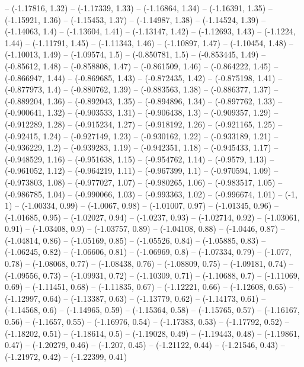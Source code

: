 -- (-1.17816, 1.32)
-- (-1.17339, 1.33)
-- (-1.16864, 1.34)
-- (-1.16391, 1.35)
-- (-1.15921, 1.36)
-- (-1.15453, 1.37)
-- (-1.14987, 1.38)
-- (-1.14524, 1.39)
-- (-1.14063, 1.4)
-- (-1.13604, 1.41)
-- (-1.13147, 1.42)
-- (-1.12693, 1.43)
-- (-1.1224, 1.44)
-- (-1.11791, 1.45)
-- (-1.11343, 1.46)
-- (-1.10897, 1.47)
-- (-1.10454, 1.48)
-- (-1.10013, 1.49)
-- (-1.09574, 1.5)
-- (-0.850781, 1.5)
-- (-0.853445, 1.49)
-- (-0.85612, 1.48)
-- (-0.858808, 1.47)
-- (-0.861509, 1.46)
-- (-0.864222, 1.45)
-- (-0.866947, 1.44)
-- (-0.869685, 1.43)
-- (-0.872435, 1.42)
-- (-0.875198, 1.41)
-- (-0.877973, 1.4)
-- (-0.880762, 1.39)
-- (-0.883563, 1.38)
-- (-0.886377, 1.37)
-- (-0.889204, 1.36)
-- (-0.892043, 1.35)
-- (-0.894896, 1.34)
-- (-0.897762, 1.33)
-- (-0.900641, 1.32)
-- (-0.903533, 1.31)
-- (-0.906438, 1.3)
-- (-0.909357, 1.29)
-- (-0.912289, 1.28)
-- (-0.915234, 1.27)
-- (-0.918192, 1.26)
-- (-0.921165, 1.25)
-- (-0.92415, 1.24)
-- (-0.927149, 1.23)
-- (-0.930162, 1.22)
-- (-0.933189, 1.21)
-- (-0.936229, 1.2)
-- (-0.939283, 1.19)
-- (-0.942351, 1.18)
-- (-0.945433, 1.17)
-- (-0.948529, 1.16)
-- (-0.951638, 1.15)
-- (-0.954762, 1.14)
-- (-0.9579, 1.13)
-- (-0.961052, 1.12)
-- (-0.964219, 1.11)
-- (-0.967399, 1.1)
-- (-0.970594, 1.09)
-- (-0.973803, 1.08)
-- (-0.977027, 1.07)
-- (-0.980265, 1.06)
-- (-0.983517, 1.05)
-- (-0.986785, 1.04)
-- (-0.990066, 1.03)
-- (-0.993363, 1.02)
-- (-0.996674, 1.01)
-- (-1, 1)
-- (-1.00334, 0.99)
-- (-1.0067, 0.98)
-- (-1.01007, 0.97)
-- (-1.01345, 0.96)
-- (-1.01685, 0.95)
-- (-1.02027, 0.94)
-- (-1.0237, 0.93)
-- (-1.02714, 0.92)
-- (-1.03061, 0.91)
-- (-1.03408, 0.9)
-- (-1.03757, 0.89)
-- (-1.04108, 0.88)
-- (-1.0446, 0.87)
-- (-1.04814, 0.86)
-- (-1.05169, 0.85)
-- (-1.05526, 0.84)
-- (-1.05885, 0.83)
-- (-1.06245, 0.82)
-- (-1.06606, 0.81)
-- (-1.06969, 0.8)
-- (-1.07334, 0.79)
-- (-1.077, 0.78)
-- (-1.08068, 0.77)
-- (-1.08438, 0.76)
-- (-1.08809, 0.75)
-- (-1.09181, 0.74)
-- (-1.09556, 0.73)
-- (-1.09931, 0.72)
-- (-1.10309, 0.71)
-- (-1.10688, 0.7)
-- (-1.11069, 0.69)
-- (-1.11451, 0.68)
-- (-1.11835, 0.67)
-- (-1.12221, 0.66)
-- (-1.12608, 0.65)
-- (-1.12997, 0.64)
-- (-1.13387, 0.63)
-- (-1.13779, 0.62)
-- (-1.14173, 0.61)
-- (-1.14568, 0.6)
-- (-1.14965, 0.59)
-- (-1.15364, 0.58)
-- (-1.15765, 0.57)
-- (-1.16167, 0.56)
-- (-1.1657, 0.55)
-- (-1.16976, 0.54)
-- (-1.17383, 0.53)
-- (-1.17792, 0.52)
-- (-1.18202, 0.51)
-- (-1.18614, 0.5)
-- (-1.19028, 0.49)
-- (-1.19443, 0.48)
-- (-1.19861, 0.47)
-- (-1.20279, 0.46)
-- (-1.207, 0.45)
-- (-1.21122, 0.44)
-- (-1.21546, 0.43)
-- (-1.21972, 0.42)
-- (-1.22399, 0.41)
